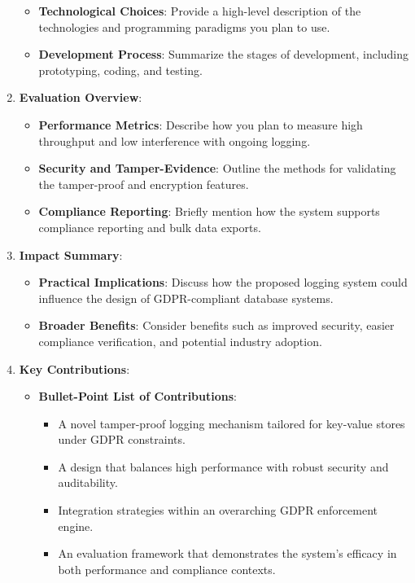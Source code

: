 \begin{enumerate}
\begin{itemize}
                      \item \textbf{Technological Choices}:
                            Provide a high-level description of the technologies and programming paradigms you plan to use.
                      \item \textbf{Development Process}:
                            Summarize the stages of development, including prototyping, coding, and testing.
              \end{itemize}
        \item \textbf{Evaluation Overview}:
              \begin{itemize}
                      \item \textbf{Performance Metrics}:
                            Describe how you plan to measure high throughput and low interference with ongoing logging.
                      \item \textbf{Security and Tamper-Evidence}:
                            Outline the methods for validating the tamper-proof and encryption features.
                      \item \textbf{Compliance Reporting}:
                            Briefly mention how the system supports compliance reporting and bulk data exports.
              \end{itemize}
        \item \textbf{Impact Summary}:
              \begin{itemize}
                      \item \textbf{Practical Implications}:
                            Discuss how the proposed logging system could influence the design of GDPR-compliant database systems.
                      \item \textbf{Broader Benefits}:
                            Consider benefits such as improved security, easier compliance verification, and potential industry adoption.
              \end{itemize}
        \item \textbf{Key Contributions}:
              \begin{itemize}
                      \item \textbf{Bullet-Point List of Contributions}:
                            \begin{itemize}
                                    \item A novel tamper-proof logging mechanism tailored for key-value stores under GDPR constraints.
                                    \item A design that balances high performance with robust security and auditability.
                                    \item Integration strategies within an overarching GDPR enforcement engine.
                                    \item An evaluation framework that demonstrates the system’s efficacy in both performance and compliance contexts.
                            \end{itemize}
              \end{itemize}
\end{enumerate}